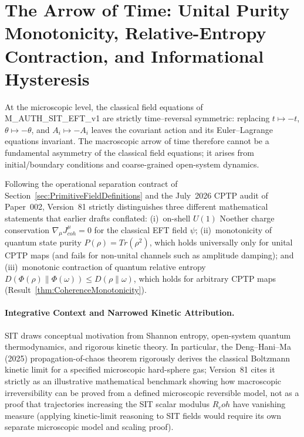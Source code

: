 \documentclass[american,11pt,letterpaper]{article}
\newcommand{\Rcoh}{R_{\mathrm{coh}}}
\def\mathrm#1{#1}%
\def\texttt#1{#1}%
\def\emph#1{#1}%
\def\Rcoh{R_coh}%
\begin{document}
\section{The Arrow of Time: Unital Purity Monotonicity, Relative-Entropy Contraction, and Informational Hysteresis}
\label{sec:arrow-of-time}
\label{sec:thermodynamics}
\label{sec:HTheoremProof}

At the microscopic level, the classical field equations of \texttt{M\_AUTH\_SIT\_EFT\_v1} are strictly time--reversal symmetric: replacing $t \mapsto -t$, $\theta \mapsto -\theta$, and $A_i \mapsto -A_i$ leaves the covariant action and its Euler--Lagrange equations invariant. The macroscopic arrow of time therefore cannot be a fundamental asymmetry of the classical field equations; it arises from initial/boundary conditions and coarse-grained open-system dynamics.

Following the operational separation contract of Section~\ref{sec:PrimitiveFieldDefinitions} and the July~2026 CPTP audit of Paper~002, Version~81 strictly distinguishes three different mathematical statements that earlier drafts conflated: (i)~on-shell $U(1)$ Noether charge conservation $\nabla_\mu J^\mu_{\mathrm{coh}} = 0$ for the classical EFT field $\psi$; (ii)~monotonicity of quantum state purity $P(\rho) = \mathrm{Tr}(\rho^2)$, which holds universally \emph{only} for unital CPTP maps (and fails for non-unital channels such as amplitude damping); and (iii)~monotonic contraction of quantum relative entropy $D(\Phi(\rho)\|\Phi(\omega)) \le D(\rho\|\omega)$, which holds for arbitrary CPTP maps (Result~\ref{thm:CoherenceMonotonicity}).

\paragraph{Integrative Context and Narrowed Kinetic Attribution.}
SIT draws conceptual motivation from Shannon entropy, open-system quantum thermodynamics, and rigorous kinetic theory. In particular, the Deng--Hani--Ma (2025) propagation-of-chaos theorem rigorously derives the classical Boltzmann kinetic limit for a specified microscopic hard-sphere gas; Version~81 cites it strictly as an illustrative mathematical benchmark showing how macroscopic irreversibility can be proved from a defined microscopic reversible model, \emph{not} as a proof that trajectories increasing the SIT scalar modulus $\Rcoh$ have vanishing measure (applying kinetic-limit reasoning to SIT fields would require its own separate microscopic model and scaling proof).
\end{document}
